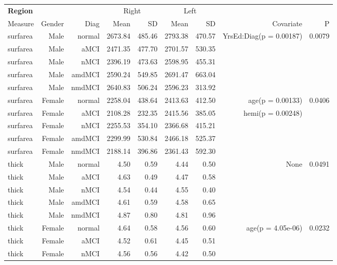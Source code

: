 \documentclass[12pt]{article}\usepackage[]{graphicx}\usepackage[]{color}
\newcommand\T{\rule{0pt}{2.6ex}}
\newcommand\B{\rule[-1.2ex]{0pt}{0pt}}
\begin{document}
  \newpage
\begin{sidewaystable}
  \centering
  \footnotesize
  \begin{tabular}{l|rr|rr|rr|rr}
	\hline
	\textbf{Region} & & & \multicolumn{2}{c}{Right} \T & \multicolumn{2}{|c}{Left} & & \\
	\multicolumn{1}{l|}{Measure} \T\B & Gender & Diag & Mean & SD & Mean & SD & Covariate & P \\
	\hline\hline
 surfarea & Male & normal & 2673.84 & 485.46 & 2793.38 & 470.57 & YrsEd:Diag(p = 0.00187) & 0.0079 \\ 
  surfarea & Male & aMCI & 2471.35 & 477.70 & 2701.57 & 530.35 &  &  \\ 
  surfarea & Male & nMCI & 2396.19 & 473.63 & 2598.95 & 455.31 &  &  \\ 
  surfarea & Male & amdMCI & 2590.24 & 549.85 & 2691.47 & 663.04 &  &  \\ 
  surfarea & Male & nmdMCI & 2640.83 & 506.24 & 2596.23 & 313.92 &  &  \\ 
   \hline
surfarea & Female & normal & 2258.04 & 438.64 & 2413.63 & 412.50 & age(p = 0.00133) & 0.0406 \\ 
  surfarea & Female & aMCI & 2108.28 & 232.35 & 2415.56 & 385.05 & hemi(p = 0.00248) &  \\ 
  surfarea & Female & nMCI & 2255.53 & 354.10 & 2366.68 & 415.21 &  &  \\ 
  surfarea & Female & amdMCI & 2299.99 & 530.84 & 2466.18 & 525.37 &  &  \\ 
  surfarea & Female & nmdMCI & 2188.14 & 396.86 & 2361.43 & 592.30 &  &  \\ 
   \hline
thick & Male & normal & 4.50 & 0.59 & 4.44 & 0.50 & None & 0.0491 \\ 
  thick & Male & aMCI & 4.63 & 0.49 & 4.47 & 0.58 &  &  \\ 
  thick & Male & nMCI & 4.54 & 0.44 & 4.55 & 0.40 &  &  \\ 
  thick & Male & amdMCI & 4.61 & 0.59 & 4.58 & 0.65 &  &  \\ 
  thick & Male & nmdMCI & 4.87 & 0.80 & 4.81 & 0.96 &  &  \\ 
   \hline
thick & Female & normal & 4.64 & 0.58 & 4.56 & 0.60 & age(p = 4.05e-06) & 0.0232 \\ 
  thick & Female & aMCI & 4.52 & 0.61 & 4.45 & 0.51 &  &  \\ 
  thick & Female & nMCI & 4.56 & 0.56 & 4.42 & 0.50 &  &  \\ 

\end{tabular}
\end{sidewaystable}
\end{document}
